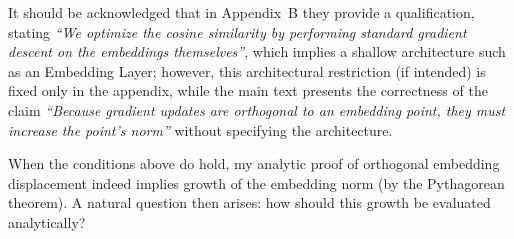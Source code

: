 It should be acknowledged that in Appendix~B they provide a qualification, stating \emph{``We optimize the cosine similarity by performing standard gradient descent on the embeddings themselves''}, which implies a shallow architecture such as an Embedding Layer; however, this architectural restriction (if intended) is fixed only in the appendix, while the main text presents the correctness of the claim \emph{``Because gradient updates are orthogonal to an embedding point, they must increase the point’s norm''} without specifying the architecture.

When the conditions above do hold, my analytic proof of orthogonal embedding displacement indeed implies growth of the embedding norm (by the Pythagorean theorem). A natural question then arises: how should this growth be evaluated analytically?


